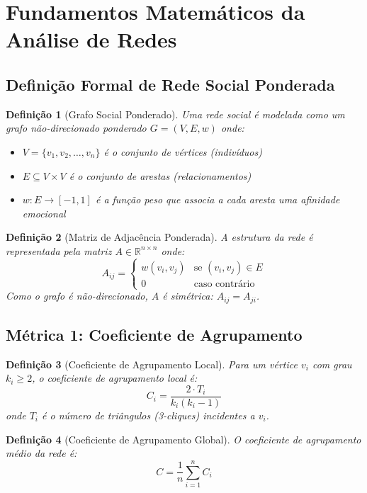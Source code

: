 \documentclass[12pt, a4paper]{article}
\newtheorem{definition}{Definição}
\begin{document}
\section{Fundamentos Matemáticos da Análise de Redes}

\subsection{Definição Formal de Rede Social Ponderada}

\begin{definition}[Grafo Social Ponderado]
Uma rede social é modelada como um grafo não-direcionado ponderado $G = (V, E, w)$ onde:
\begin{itemize}
\item $V = \{v_1, v_2, \dots, v_n\}$ é o conjunto de vértices (indivíduos)
\item $E \subseteq V \times V$ é o conjunto de arestas (relacionamentos)
\item $w: E \to [-1, 1]$ é a função peso que associa a cada aresta uma afinidade emocional
\end{itemize}
\end{definition}

\begin{definition}[Matriz de Adjacência Ponderada]
A estrutura da rede é representada pela matriz $A \in \mathbb{R}^{n \times n}$ onde:
\[
A_{ij} = 
\begin{cases}
w(v_i, v_j) & \text{se } (v_i, v_j) \in E \\
0 & \text{caso contrário}
\end{cases}
\]
Como o grafo é não-direcionado, $A$ é simétrica: $A_{ij} = A_{ji}$.
\end{definition}

\subsection{Métrica 1: Coeficiente de Agrupamento}

\begin{definition}[Coeficiente de Agrupamento Local]
Para um vértice $v_i$ com grau $k_i \geq 2$, o coeficiente de agrupamento local é:
\[
C_i = \frac{2 \cdot T_i}{k_i(k_i - 1)}
\]
onde $T_i$ é o número de triângulos (3-cliques) incidentes a $v_i$.
\end{definition}

\begin{definition}[Coeficiente de Agrupamento Global]
O coeficiente de agrupamento médio da rede é:
\[
C = \frac{1}{n} \sum_{i=1}^n C_i
\]
\end{definition}
\end{document}
